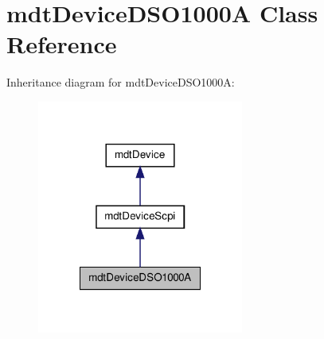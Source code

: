 \hypertarget{classmdt_device_d_s_o1000_a}{
\section{mdtDeviceDSO1000A Class Reference}
\label{classmdt_device_d_s_o1000_a}
}


Inheritance diagram for mdtDeviceDSO1000A:
\nopagebreak
\begin{figure}[H]
\begin{center}
\leavevmode
\includegraphics[width=192pt]{classmdt_device_d_s_o1000_a__inherit__graph}
\end{center}
\end{figure}



